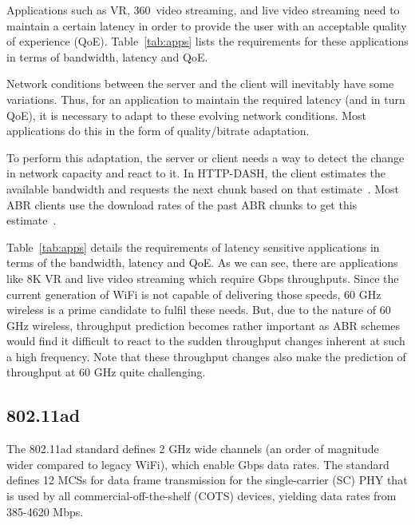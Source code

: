 \documentclass[sigconf,anonymous]{acmart}
\begin{document}
Applications such as VR, 360\degree~video streaming, and live video
streaming need to maintain a certain latency in order to provide the
user with an acceptable quality of experience
(QoE). Table~\ref{tab:apps} lists the requirements for these
applications in terms of bandwidth, latency and QoE.

Network conditions between the server and the client will inevitably have some variations. Thus, for an application to maintain the required latency (and in turn QoE), it is necessary to adapt to these evolving network conditions. Most applications do this in the form of quality/bitrate adaptation.

To perform this adaptation, the server or client needs a way to detect the change in network capacity and react to it. In HTTP-DASH, the client estimates the available bandwidth and requests the next chunk based on that estimate~\cite{stockhammer:mmsys2011}. Most ABR clients use the download rates of the past ABR chunks to get this estimate~\cite{bentaleb:cst2019}.

Table~\ref{tab:apps} details the requirements of latency sensitive
applications in terms of the bandwidth, latency and QoE. As we can
see, there are applications like 8K VR and live video streaming which
require Gbps throughputs. Since the current generation of WiFi is not
capable of delivering those speeds, 60 GHz wireless is a prime
candidate to fulfil these needs. But, due to the nature of 60 GHz
wireless, throughput prediction becomes rather important as ABR
schemes would find it difficult to react to the sudden throughput
changes inherent at such a high frequency. Note that these throughput
changes also make the prediction of throughput at 60 GHz quite
challenging.

\subsection{802.11ad}

The 802.11ad standard defines 2 GHz wide channels (an order of magnitude wider compared to legacy WiFi), which enable Gbps data rates. The standard defines 12 MCSs for data frame transmission for the single-carrier (SC) PHY that is used by all commercial-off-the-shelf (COTS) devices, yielding data rates from 385-4620 Mbps. 
\end{document}
